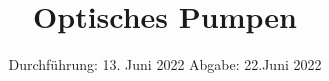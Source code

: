 

\subject{V21}
\title{Optisches Pumpen}
\date{%
  Durchführung: 13. Juni 2022
  \hspace{3em}
  Abgabe: 22.Juni 2022
}



\maketitle
\thispagestyle{empty}
\tableofcontents
\newpage








\printbibliography{}



